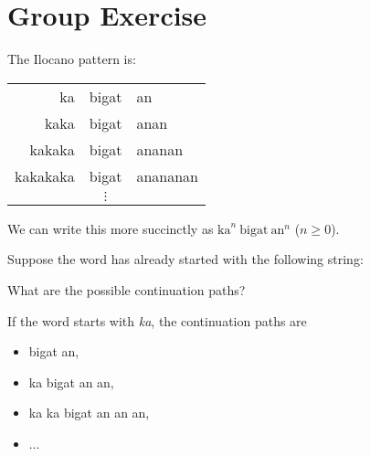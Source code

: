 \clearpage
\section*{Group Exercise}
\thispagestyle{empty}
\noindent
The Ilocano pattern is:
%
\begin{center}
    \begin{tabular}{rcl}
        ka & bigat & an\\
        kaka & bigat & anan\\
        kakaka& bigat & ananan\\
        kakakaka& bigat & anananan\\
        & $\vdots$\\
    \end{tabular}
\end{center}
%
We can write this more succinctly as $\text{ka}^n\ \text{bigat}\ \text{an}^n$ ($n \geq 0$).

\noindent
Suppose the word has already started with the following string:

\vspace{6em}

\noindent
What are the possible continuation paths?

\begin{example}
    If the word starts with \emph{ka}, the continuation paths are
    \begin{itemize}
        \item bigat an,
        \item ka bigat an an,
        \item ka ka bigat an an an,
        \item $\ldots$
    \end{itemize}
\end{example}

